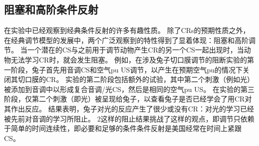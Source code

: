 \subsection{阻塞和高阶条件反射}

在实验中已经观察到经典条件反射的许多有趣性质。
除了CRs的预期性质之外，在经典调节模型的发展中，两个广泛观察到的特性得到了显着体现：阻塞和高阶调节。
当一个潜在的CS与之前用于调节动物产生CR的另一个CS一起出现时，当动物无法学习CR时，就会发生阻塞。
例如，在涉及兔子切口膜调节的阻断实验的第一阶段，兔子首先用音调CS和空气pu US调节，以产生在预期空气pu的情况下关闭其切口膜的CR。
实验的第二阶段包括额外的试验，其中第二个刺激（例如光）被添加到音调中以形成复合音调/光CS，然后是相同的空气pu US。
在实验的第三阶段，仅第二个刺激（即光）被呈现给兔子，以查看兔子是否已经学会了用CR对其作出反应。
结果表明，兔子对光的反应产生了很少或没有CR：对光的学习已经被先前对音调的学习所阻止。
2这样的阻止结果挑战了这样的观点，即调节只依赖于简单的时间连续性，即必要和足够的条件条件反射是美国经常在时间上紧跟CS。
